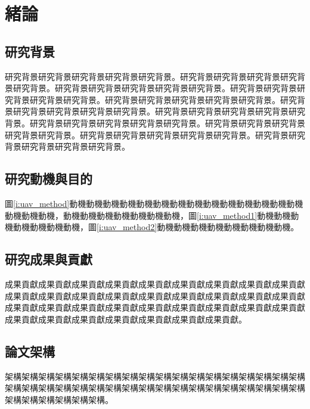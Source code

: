 \chapter{緒論}  %
\label{c:intro}


\section{研究背景}

研究背景研究背景研究背景研究背景研究背景。研究背景研究背景研究背景研究背景研究背景。研究背景研究背景研究背景研究背景研究背景。研究背景研究背景研究背景研究背景研究背景。研究背景研究背景研究背景研究背景研究背景。研究背景研究背景研究背景研究背景研究背景。研究背景研究背景研究背景研究背景研究背景。研究背景研究背景研究背景研究背景研究背景\cite{01}。研究背景研究背景研究背景研究背景研究背景。研究背景研究背景研究背景研究背景研究背景。研究背景研究背景研究背景研究背景研究背景\cite{02, 14}。

\section{研究動機與目的}

圖\ref{i:uav_method}動機動機動機動機動機動機動機動機動機動機動機動機動機動機動機動機動機，動機動機動機動機動機動機動機，圖\ref{i:uav_method1}動機動機動機動機動機動機動機，圖\ref{i:uav_method2}動機動機動機動機動機動機動機動機。

\section{研究成果與貢獻}
成果貢獻成果貢獻成果貢獻成果貢獻成果貢獻成果貢獻成果貢獻成果貢獻成果貢獻成果貢獻成果貢獻成果貢獻成果貢獻成果貢獻成果貢獻成果貢獻成果貢獻成果貢獻成果貢獻成果貢獻成果貢獻成果貢獻成果貢獻成果貢獻成果貢獻成果貢獻成果貢獻成果貢獻成果貢獻成果貢獻成果貢獻成果貢獻成果貢獻成果貢獻。

\section{論文架構}
架構架構架構架構架構架構架構架構架構架構架構架構架構架構架構架構架構架構架構架構架構架構架構架構架構架構架構架構架構架構架構架構架構架構架構架構架構架構架構架構架構架構。
